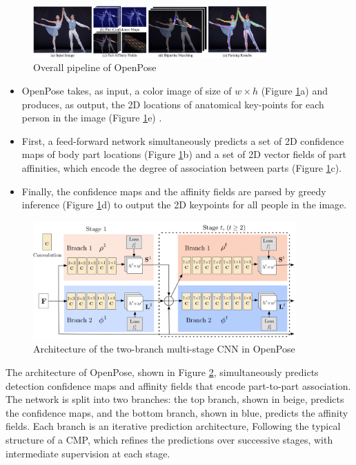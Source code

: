 \begin{figure}[htbp]
  \centering\includegraphics[width=0.8\textwidth]{./img/paf.png}
  \caption[Overall pipeline of OpenPose]{Overall pipeline of OpenPose \cite{cao2017realtime}}\label{fig:paf}
\end{figure}

\begin{itemize}
\item OpenPose takes, as input, a color image of size of $w \times h$ (Figure \ref{fig:paf}a) and produces, as output, the 2D locations of anatomical key-points for each person in the image (Figure \ref{fig:paf}e) \cite{cao2017realtime}.
\item First, a feed-forward network simultaneously predicts a set of 2D confidence maps of body part locations (Figure \ref{fig:paf}b) and a set of 2D vector fields of part affinities, which encode the degree of association between parts (Figure \ref{fig:paf}c).
\item Finally, the confidence maps and the affinity fields are parsed by greedy inference (Figure \ref{fig:paf}d) to output the 2D keypoints for all people in the image.
\end{itemize}

\begin{figure}[!htbp]
\centering\includegraphics[width=0.9\textwidth]{./img/OpenPoseArchitecture.png}
  \caption[Architecture of the two-branch multi-stage CNN in OpenPose]{Architecture of the two-branch multi-stage CNN in OpenPose \cite{cao2017realtime}}\label{fig:architecture}
\end{figure}

\par The architecture of OpenPose, shown in Figure \ref{fig:architecture}, simultaneously predicts detection confidence maps and affinity fields that encode part-to-part association. The network is split into two branches: the top branch, shown in beige, predicts the confidence maps, and the bottom branch, shown in blue, predicts the affinity fields. Each branch is an iterative prediction architecture, Following the typical structure of a CMP, which refines the predictions over successive stages, with intermediate supervision at each stage.

